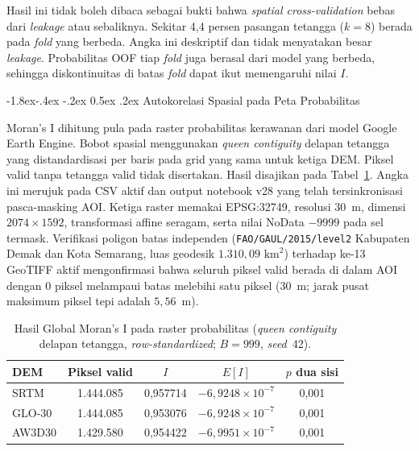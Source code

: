 \documentclass[12pt,a4paper]{article}
\makeatletter
\renewcommand\subsubsection{\@startsection{subsubsection}{3}{\z@}%
  {-1.8ex\@plus -.4ex \@minus -.2ex}%
  {0.5ex \@plus .2ex}%
  {\normalfont\normalsize\bfseries}}
\makeatother
\begin{document}
Hasil ini tidak boleh dibaca sebagai bukti bahwa \textit{spatial
cross-validation} bebas dari \textit{leakage} atau sebaliknya. Sekitar 4,4
persen pasangan tetangga ($k=8$) berada pada \textit{fold} yang berbeda.
Angka ini deskriptif dan tidak menyatakan besar \textit{leakage}. Probabilitas
OOF tiap \textit{fold} juga berasal dari model yang berbeda, sehingga
diskontinuitas di batas \textit{fold} dapat ikut memengaruhi nilai $I$.

\subsubsection{Autokorelasi Spasial pada Peta Probabilitas}

Moran's I dihitung pula pada raster probabilitas kerawanan dari model Google
Earth Engine. Bobot spasial menggunakan \textit{queen contiguity} delapan
tetangga yang distandardisasi per baris pada grid yang sama untuk ketiga DEM.
Piksel valid tanpa tetangga valid tidak disertakan. Hasil disajikan pada
Tabel~\ref{tab:moran-raster}. Angka ini merujuk pada CSV aktif dan output notebook
v28 yang telah tersinkronisasi pasca-masking AOI. Ketiga raster memakai
EPSG:32749, resolusi 30~m, dimensi $2074\times1592$, transformasi affine
seragam, serta nilai NoData $-9999$ pada sel termask. Verifikasi poligon
batas independen (\texttt{FAO/GAUL/2015/level2} Kabupaten Demak dan Kota
Semarang, luas geodesik $1.310{,}09\text{ km}^2$) terhadap ke-13 GeoTIFF
aktif mengonfirmasi bahwa seluruh piksel valid berada di dalam AOI dengan 0
piksel melampaui batas melebihi satu piksel ($30$~m; jarak pusat maksimum
piksel tepi adalah $5{,}56$~m).

\begin{table}[!htbp]
\centering
\caption[Hasil Global Moran's I pada raster probabilitas]{Hasil Global Moran's I pada raster probabilitas (\textit{queen
contiguity} delapan tetangga, \textit{row-standardized}; $B=999$, \textit{seed}~42).}
\label{tab:moran-raster}
\begin{tabular}{lcccc}
\toprule
\textbf{DEM} & \textbf{Piksel valid} & \textbf{$I$} & \textbf{$E[I]$} & \textbf{$p$ dua sisi} \\
\midrule
SRTM   & 1.444.085 & 0,957714 & $-6{,}9248 \times 10^{-7}$ & 0,001 \\
GLO-30 & 1.444.085 & 0,953076 & $-6{,}9248 \times 10^{-7}$ & 0,001 \\
AW3D30 & 1.429.580 & 0,954422 & $-6{,}9951 \times 10^{-7}$ & 0,001 \\
\bottomrule
\end{tabular}
\end{table}
\end{document}
